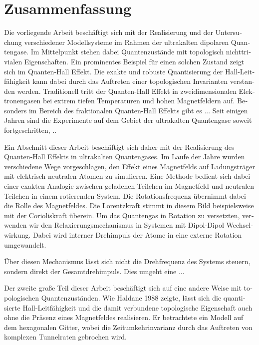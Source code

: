 \chapter*{Zusammenfassung}

\begin{otherlanguage}{ngerman}

Die vorliegende Arbeit beschäftigt sich mit der Realisierung und der Untersuchung verschiedener
Modellsysteme im Rahmen der ultrakalten dipolaren Quantengase.
Im Mittelpunkt stehen dabei Quantenzustände mit topologisch nichttrivialen Eigenschaften.
Ein prominentes Beispiel für einen solchen Zustand zeigt sich im Quanten-Hall Effekt.
Die exakte und robuste Quantisierung der Hall-Leitfähigkeit kann dabei durch das Auftreten einer topologischen Invarianten verstanden werden.
Traditionell tritt der Quanten-Hall Effekt in zweidimensionalen Elektronengasen bei extrem tiefen Temperaturen und hohen Magnetfeldern auf.
Besonders im Bereich des fraktionalen Quanten-Hall Effekts gibt es ...
Seit einigen Jahren sind die Experimente auf dem Gebiet der ultrakalten Quantengase soweit fortgeschritten, ..

Ein Abschnitt dieser Arbeit beschäftigt sich daher mit der Realisierung des Quanten-Hall Effekts in ultrakalten Quantengases.
Im Laufe der Jahre wurden verschiedene Wege vorgeschlagen, den Effekt eines Magnetfelds auf Ladungsträger mit elektrisch neutralen Atomen zu simulieren.
Eine Methode bedient sich dabei einer exakten Analogie zwischen geladenen Teilchen im Magnetfeld und neutralen Teilchen in einem rotierenden System.
Die Rotationsfrequenz übernimmt dabei die Rolle des Magnetfeldes.
Die Lorentzkraft stimmt in diesem Bild beispielsweise mit der Corioliskraft überein.
Um das Quantengas in Rotation zu versetzten, verwenden wir den Relaxierungsmechanismus in Systemen mit Dipol-Dipol Wechselwirkung.
Dabei wird interner Drehimpuls der Atome in eine externe Rotation umgewandelt.

Über diesen Mechanismus lässt sich nicht die Drehfrequenz des Systems steuern, sondern direkt der Gesamtdrehimpuls.
Dies umgeht eine ...

Der zweite große Teil dieser Arbeit beschäftigt sich auf eine andere Weise mit topologischen Quantenzuständen.
Wie Haldane 1988 zeigte, lässt sich die quantisierte Hall-Leitfähigkeit und die damit verbundene topologische Eigenschaft auch ohne die Präsenz eines Magnetfeldes realisieren.
Er betrachtete ein Modell auf dem hexagonalen Gitter, wobei die Zeitumkehrinvarianz durch das Auftreten von komplexen Tunnelraten gebrochen wird.


\end{otherlanguage}
